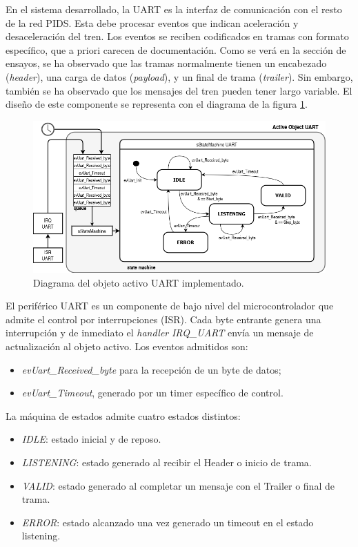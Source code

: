 En el sistema desarrollado, la UART es la interfaz de comunicación con el resto de la red PIDS. Esta debe procesar eventos que indican aceleración y desaceleración del tren. Los eventos se reciben codificados en tramas con formato específico, que a priori carecen de documentación. Como se verá en la sección de ensayos, se ha observado que las tramas normalmente tienen un encabezado (\textit{header}), una carga de datos (\textit{payload}), y un final de trama (\textit{trailer}). Sin embargo, también se ha observado que los mensajes del tren pueden tener largo variable. El diseño de este componente se representa con el diagrama de la figura \ref{fig:diagfsmUART}.\\


\begin{figure}[ht]
	\centering
	\includegraphics[width=1\textwidth]{./Figures/fsmUART3.png}
	\caption{Diagrama del objeto activo UART implementado.}
	\label{fig:diagfsmUART}
\end{figure}

El periférico UART es un componente de bajo nivel del microcontrolador que admite el control por interrupciones (ISR). Cada byte entrante genera una interrupción y de inmediato el \textit{handler} \textit{IRQ\_UART} envía un mensaje de actualización al objeto activo. Los eventos admitidos son:
\begin{itemize}
\item \textit{evUart\_Received\_byte} para la recepción de un byte de datos; 
\item \textit{evUart\_Timeout}, generado por un timer específico de control.\\
\end{itemize} 

La máquina de estados admite cuatro estados distintos:
\begin{itemize}
\item \textit{IDLE}: estado inicial y de reposo.
\item \textit{LISTENING}: estado generado al recibir el Header o inicio de trama.
\item \textit{VALID}: estado generado al completar un mensaje con el Trailer o final de trama.
\item \textit{ERROR}: estado alcanzado una vez generado un timeout en el estado listening.
\end{itemize}

